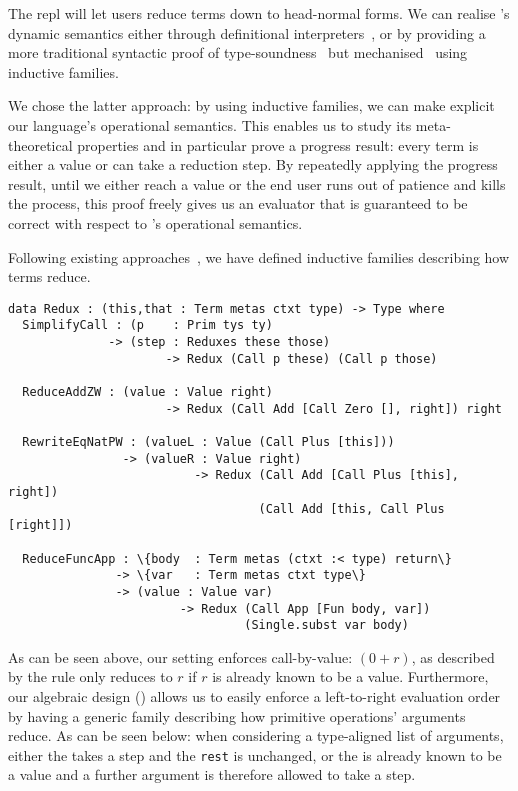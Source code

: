 The \Velo{} \acs*{repl} will let users reduce terms down to head-normal forms.
%
We can realise \Velo{}'s dynamic semantics either through definitional
interpreters~\cite{10.1145/3093333.3009866,Augustsson1999edt},
or by providing a more traditional syntactic proof of
type-soundness~\cite{DBLP:journals/iandc/WrightF94}
but mechanised~\cite[Part 2: Properties]{plfa22.08} using inductive families.

We chose the latter approach: by using inductive families, we can make explicit
our language's operational semantics.
%
This enables us to study its meta-theoretical properties and in particular prove
a progress result: every term is either a value or can take a reduction step.
%
By repeatedly applying the progress result, until we either reach a value or the end
user runs out of patience and kills the process, this proof freely gives us an
evaluator that is guaranteed to be correct with respect to \Velo{}'s operational
semantics.

Following existing approaches~\cite[Part 2: Properties]{plfa22.08}, we have defined
inductive families describing how terms reduce.

\begin{Verbatim}
data Redux : (this,that : Term metas ctxt type) -> Type where
  SimplifyCall : (p    : Prim tys ty)
              -> (step : Reduxes these those)
                      -> Redux (Call p these) (Call p those)

  ReduceAddZW : (value : Value right)
                      -> Redux (Call Add [Call Zero [], right]) right

  RewriteEqNatPW : (valueL : Value (Call Plus [this]))
                -> (valueR : Value right)
                          -> Redux (Call Add [Call Plus [this], right])
                                   (Call Add [this, Call Plus [right]])

  ReduceFuncApp : \{body  : Term metas (ctxt :< type) return\}
               -> \{var   : Term metas ctxt type\}
               -> (value : Value var)
                        -> Redux (Call App [Fun body, var])
                                 (Single.subst var body)
\end{Verbatim}

As can be seen above, our setting enforces call-by-value: $(0 + r)$, as described by the rule  only reduces to $r$ if $r$ is already known to be a value.
%
Furthermore, our algebraic design () allows
us to easily enforce a left-to-right evaluation order by having a generic
family describing how primitive operations' arguments reduce.
%
As can be seen below: when considering a type-aligned list of arguments,
either the  takes a step and the \texttt{rest} is unchanged,
or the  is already known to be a value and a further argument
is therefore allowed to take a step.


